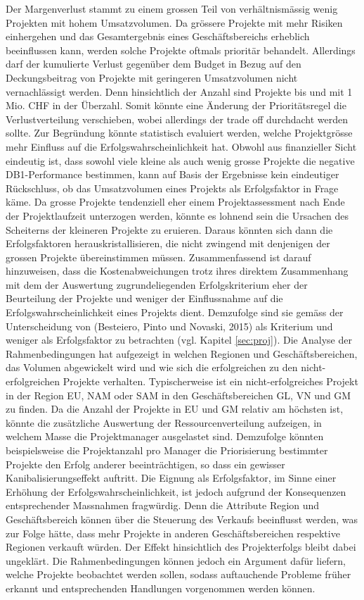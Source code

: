 \newline Der Margenverlust stammt zu einem grossen Teil von verhältnismässig wenig Projekten mit hohem Umsatzvolumen. Da grössere Projekte mit mehr Risiken einhergehen und das Gesamtergebnis eines Geschäftsbereichs erheblich beeinflussen kann, werden solche Projekte oftmals prioritär behandelt. Allerdings darf der kumulierte Verlust gegenüber dem Budget in Bezug auf den Deckungsbeitrag von Projekte mit geringeren Umsatzvolumen nicht vernachlässigt werden. Denn hinsichtlich der Anzahl sind Projekte bis und mit 1 Mio. CHF in der Überzahl. Somit könnte eine Änderung der Prioritätsregel die Verlustverteilung verschieben, wobei allerdings der trade off durchdacht werden sollte. Zur Begründung könnte statistisch evaluiert werden, welche Projektgrösse mehr Einfluss auf die Erfolgswahrscheinlichkeit hat. Obwohl aus finanzieller Sicht eindeutig ist, dass sowohl viele kleine als auch wenig grosse Projekte die negative DB1-Performance bestimmen, kann auf Basis der Ergebnisse kein eindeutiger Rückschluss, ob das Umsatzvolumen eines Projekts als Erfolgsfaktor in Frage käme. Da grosse Projekte tendenziell eher einem Projektassessment nach Ende der Projektlaufzeit unterzogen werden, könnte es lohnend sein die Ursachen des Scheiterns der kleineren Projekte zu eruieren. Daraus könnten sich dann die Erfolgsfaktoren herauskristallisieren, die nicht zwingend mit denjenigen der grossen Projekte übereinstimmen müssen. Zusammenfassend ist darauf hinzuweisen, dass die Kostenabweichungen trotz ihres direktem Zusammenhang mit dem der Auswertung zugrundeliegenden Erfolgskriterium eher der Beurteilung der Projekte und weniger der Einflussnahme auf die Erfolgswahrscheinlichkeit eines Projekts dient. Demzufolge sind sie gemäss der Unterscheidung von (Besteiero, Pinto und Novaski, 2015) als Kriterium und weniger als Erfolgsfaktor zu betrachten (vgl. Kapitel \ref{sec:proj}). 
\newline\newline
Die Analyse der Rahmenbedingungen hat aufgezeigt in welchen Regionen und Geschäftsbereichen, das Volumen abgewickelt wird und wie sich die erfolgreichen zu den nicht-erfolgreichen Projekte verhalten. Typischerweise ist ein nicht-erfolgreiches Projekt in der Region EU, NAM oder SAM in den Geschäftsbereichen GL, VN und GM zu finden. Da die Anzahl der Projekte in EU und GM relativ am höchsten ist, könnte die zusätzliche Auswertung der Ressourcenverteilung aufzeigen, in welchem Masse die Projektmanager ausgelastet sind. Demzufolge könnten beispielsweise die Projektanzahl pro Manager die Priorisierung bestimmter Projekte den Erfolg anderer beeinträchtigen, so dass ein gewisser Kanibalisierungseffekt auftritt. Die Eignung als Erfolgsfaktor, im Sinne einer Erhöhung der Erfolgswahrscheinlichkeit, ist jedoch aufgrund der Konsequenzen entsprechender Massnahmen fragwürdig. Denn die Attribute Region und Geschäftsbereich können über die Steuerung des Verkaufs beeinflusst werden, was zur Folge hätte, dass mehr Projekte in anderen Geschäftsbereichen respektive Regionen verkauft würden. Der Effekt hinsichtlich des Projekterfolgs bleibt dabei ungeklärt. Die Rahmenbedingungen können jedoch ein Argument dafür liefern, welche Projekte beobachtet werden sollen, sodass auftauchende Probleme früher erkannt und entsprechenden Handlungen vorgenommen werden können.
